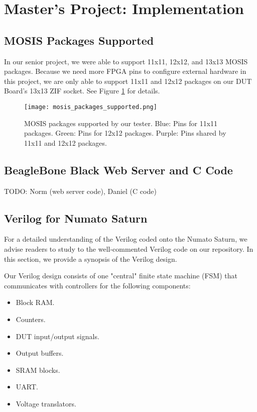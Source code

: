 \section{Master's Project: Implementation}

\subsection{MOSIS Packages Supported}
In our senior project, we were able to support 11x11, 12x12, and 13x13 MOSIS packages. Because we need more FPGA pins to configure external hardware in this project, we are only able to support 11x11 and 12x12 packages on our DUT Board's 13x13 ZIF socket. See Figure \ref{fig:mosis_packages_supported} for details.

\begin{figure}
\texttt{[image: mosis\_packages\_supported.png]}
\caption{MOSIS packages supported by our tester. Blue: Pins for 11x11 packages. Green: Pins for 12x12 packages. Purple: Pins shared by 11x11 and 12x12 packages.}
\label{fig:mosis_packages_supported}
\end{figure}

\subsection{BeagleBone Black Web Server and C Code}
TODO: Norm (web server code), Daniel (C code)

\subsection{Verilog for Numato Saturn}
For a detailed understanding of the Verilog coded onto the Numato Saturn, we advise readers to study to the well-commented Verilog code on our repository. In this section, we provide a synopsis of the Verilog design.

Our Verilog design consists of one "central" finite state machine (FSM) that communicates with controllers for the following components: 
\begin{itemize}
	\item Block RAM.
	\item Counters.
	\item DUT input/output signals.
	\item Output buffers.
	\item SRAM blocks.
	\item UART.
	\item Voltage translators.
\end{itemize}

